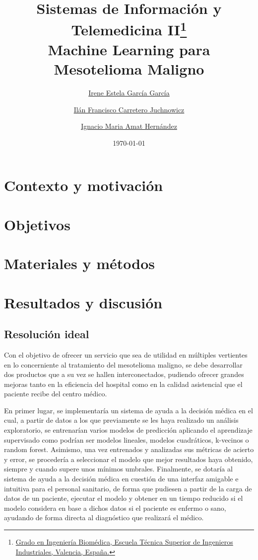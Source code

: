 \documentclass{article}
\title{Sistemas de Información y Telemedicina II\thanks{\href{https://www.upv.es/titulaciones/GIB/indexc.html}{Grado en Ingeniería Biomédica, Escuela Técnica Superior de Ingenieros Industriales, Valencia, España.}} \\\textbf{Machine Learning para Mesotelioma Maligno}}
\author{
\href{mailto:irgarga4@etsii.upv.es}{Irene Estela García García}
\and
\href{mailto:ilcarjuc@etsii.upv.es}{Ilán Francisco Carretero Juchnowicz}
\and
\href{mailto:igamher@etsid.upv.es}{Ignacio Maria Amat Hernández}
}
\date{\today}
\begin{document}
\maketitle
\newpage
\tableofcontents
\listoffigures
\lstlistoflistings
\newpage

\section{Contexto y motivación}
\section{Objetivos}
\newpage
\section{Materiales y métodos}
\section{Resultados y discusión}
\subsection{Resolución ideal}

Con el objetivo  de  ofrecer  un  servicio  que  sea  de  utilidad  en
múltiples vertientes en lo concerniente al tratamiento del mesotelioma
maligno, se debe desarrollar dos productos que	a  su  vez  se	hallen
interconectados,  pudiendo  ofrecer  grandes  mejoras  tanto   en   la
eficiencia del hospital como en la calidad asistencial que el paciente
recibe del centro médico.

En primer lugar, se implementaría un sistema de ayuda  a  la  decisión
médica en el cual, a partir de datos a los que previamente se les haya
realizado un análisis exploratorio, se entrenarían varios  modelos  de
predicción aplicando  el  aprendizaje  supervisado  como  podrían  ser
modelos lineales, modelos  cuadráticos,  k-vecinos  o  random  forest.
Asimismo, una vez entrenados y analizadas sus métricas	de  acierto  y
error, se procedería a seleccionar el modelo que mejor resultados haya
obtenido, siempre y cuando supere unos mínimos umbrales.   Finalmente,
se dotaría al sistema de ayuda a la decisión médica en cuestión de una
interfaz amigable e intuitiva para el personal sanitario, de forma que
pudiesen a partir de la carga de datos de  un  paciente,  ejecutar  el
modelo y obtener en un tiempo reducido si el modelo considera en  base
a dichos datos si el paciente es enfermo o  sano,  ayudando  de  forma
directa al diagnóstico que realizará el médico.
\end{document}

